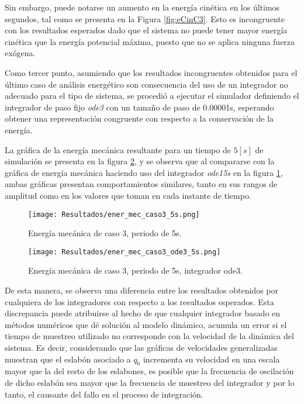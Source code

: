     Sin embargo, puede notarse un aumento en la energía cinética en los últimos segundos, 
    tal como se presenta en la Figura \ref{fig:eCinC3}. Esto es 
    incongruente con los resultados esperados dado que el sistema no puede tener mayor 
    energía cinética que la energía potencial máxima, puesto que no se aplica ninguna 
    fuerza exógena.

    Como tercer punto, asumiendo que los resultados incongruentes obtenidos para el 
    último caso de análisis energético son consecuencia del uso de un integrador 
    no adecuado para el tipo de sistema, se procedió a ejecutar el simulador 
    definiendo el integrador de paso fijo \emph{ode3} con un tamaño de paso de 
    0.00001s, esperando obtener una representación congruente con respecto a 
    la conservación de la energía.

    La gráfica de la energía mecánica resultante para un tiempo de $5[s]$ de simulación 
    se presenta en la figura \ref{fig:em_3_ode3}, y se observa que al compararse con la gráfica 
    de energía mecánica haciendo uso del integrador \emph{ode15s} en la figura \ref{fig:em_3}, ambas gráficas presentan 
    comportamientos similares, tanto en sus rangos de amplitud como en los valores que toman 
    en cada instante de tiempo.

    \begin{figure}[H]
        \centering
        \texttt{[image: Resultados/ener\_mec\_caso3\_5s.png]} 
        \caption{Energía mecánica de caso 3, periodo de 5s.}
        \label{fig:em_3}
    \end{figure}

    \begin{figure}[H]
        \centering
        \texttt{[image: Resultados/ener\_mec\_caso3\_ode3\_5s.png]} 
        \caption{Energía mecánica de caso 3, periodo de 5s, integrador ode3.}
        \label{fig:em_3_ode3}
    \end{figure}

    De esta manera, se observa una diferencia entre los resultados obtenidos por cualquiera de los integradores con respecto a 
    los resultados esperados. Esta discrepancia puede atribuirse al hecho de que cualquier integrador basado 
    en métodos numéricos que dé solución al modelo dinámico, acumula un error si el tiempo de 
    muestreo utilizado no corresponde con la velocidad de la dinámica del sistema. Es decir, 
    considerando que las gráficas de velocidades generalizadas muestran que el eslabón asociado a $q_6$ 
    incrementa su velocidad en una escala mayor que la del resto de los eslabones, es posible 
    que la frecuencia de oscilación de dicho eslabón sea mayor que la frecuencia de muestreo del integrador 
    y por lo tanto, el causante del fallo en el proceso de integración.

